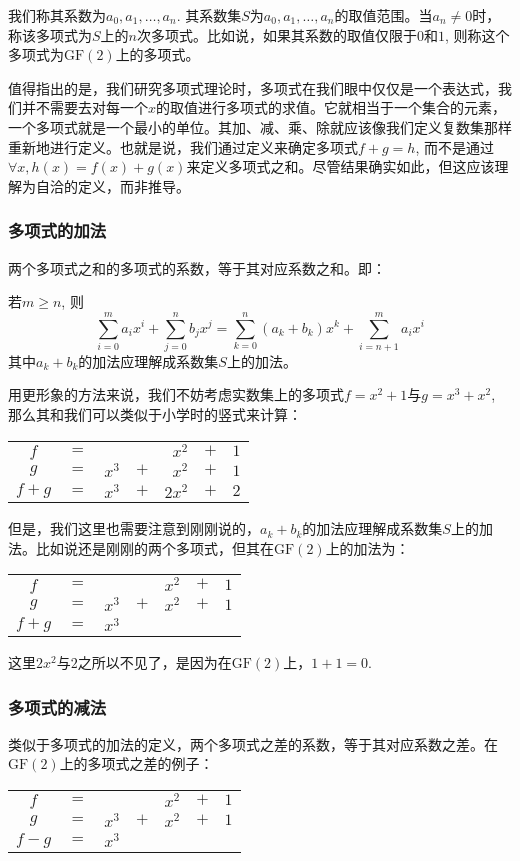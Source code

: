 \documentclass[UTF8]{ctexrep}
\def\pth#1{\left( {#1}\right)}
\def\GF{\mathrm{GF}}
\begin{document}
我们称其系数为$a_0, a_1,\ldots, a_n$. 其系数集$S$为$a_0, a_1,\ldots ,a_n$的取值范围。当$a_n\neq 0$时，称该多项式为$S$上的$n$次多项式。比如说，如果其系数的取值仅限于$0$和$1$, 则称这个多项式为$\GF\pth{2}$上的多项式。\par
值得指出的是，我们研究多项式理论时，多项式在我们眼中仅仅是一个表达式，我们并不需要去对每一个$x$的取值进行多项式的求值。它就相当于一个集合的元素，一个多项式就是一个最小的单位。其加、减、乘、除就应该像我们定义复数集那样重新地进行定义。也就是说，我们通过定义来确定多项式$f+g=h$, 而不是通过$\forall x, h(x)=f(x)+g(x)$来定义多项式之和。尽管结果确实如此，但这应该理解为自洽的定义，而非推导。\par
\subsubsection{多项式的加法}
两个多项式之和的多项式的系数，等于其对应系数之和。即：\par
若$m\geq n$, 则
\begin{equation}
    \sum_{i=0}^ma_ix^i+\sum_{j=0}^nb_jx^j=\sum_{k=0}^n\pth{a_k+b_k}x^k+\sum_{i=n+1}^ma_ix^i
\end{equation}
其中$a_k+b_k$的加法应理解成系数集$S$上的加法。\par
用更形象的方法来说，我们不妨考虑实数集上的多项式$f=x^2+1$与$g=x^3+x^2$, 那么其和我们可以类似于小学时的竖式来计算：
\begin{table}[H]
    \centering
    \begin{tabular}{ccrcrcr}
        $f$&$=$&&&$x^2$&$+$&$1$\\
        $g$&$=$&$x^3$&$+$&$x^2$&$+$&$1$\\\hline
        $f+g$&$=$&$x^3$&$+$&$2x^2$&$+$&$2$
    \end{tabular}
\end{table}

但是，我们这里也需要注意到刚刚说的，$a_k+b_k$的加法应理解成系数集$S$上的加法。比如说还是刚刚的两个多项式，但其在$\GF\pth{2}$上的加法为：
\begin{table}[H]
    \centering
    \begin{tabular}{ccrcrcr}
        $f$&$=$&&&$x^2$&$+$&$1$\\
        $g$&$=$&$x^3$&$+$&$x^2$&$+$&$1$\\\hline
        $f+g$&$=$&$x^3$&&&&
    \end{tabular}
\end{table}

这里$2x^2$与$2$之所以不见了，是因为在$\GF\pth{2}$上，$1+1=0$.
\subsubsection{多项式的减法}
类似于多项式的加法的定义，两个多项式之差的系数，等于其对应系数之差。在$\GF\pth{2}$上的多项式之差的例子：
\begin{table}[H]
    \centering
    \begin{tabular}{ccrcrcr}
        $f$&$=$&&&$x^2$&$+$&$1$\\
        $g$&$=$&$x^3$&$+$&$x^2$&$+$&$1$\\\hline
        $f-g$&$=$&$x^3$&&&&
    \end{tabular}
\end{table}
\end{document}
